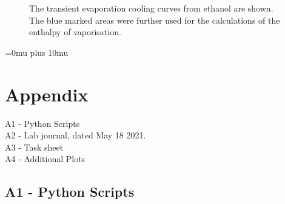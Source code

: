 \documentclass[a4paper,abstracton]{article}	                       %
\begin{document}
\begin{figure}[H]
    \centering
    
    \caption{\label{fig:DDR4}The transient evaporation cooling curves from ethanol are shown. The blue marked areas were further used for the calculations of the enthalpy of vaporisation.}
\end{figure}


\pagebreak

\setcounter{biburllcpenalty}{7000}
\setcounter{biburlucpenalty}{8000}
\Urlmuskip=0mu plus 10mu
\printbibliography

 

 \newpage 
  
\section*{Appendix}
A1 - Python Scripts\\
A2 - Lab journal, dated May 18 2021.\\
A3 - Task sheet \\
A4 - Additional Plots\\


\subsection*{A1 - Python Scripts}
\end{document}
